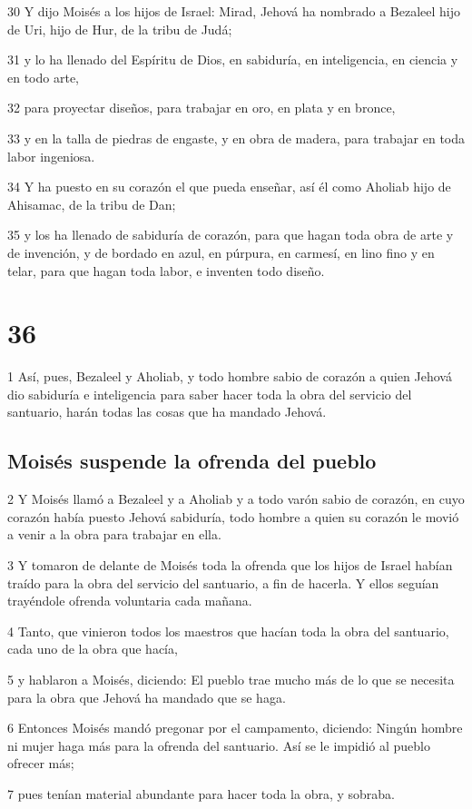 \par 30 Y dijo Moisés a los hijos de Israel: Mirad, Jehová ha nombrado a Bezaleel hijo de Uri, hijo de Hur, de la tribu de Judá;
\par 31 y lo ha llenado del Espíritu de Dios, en sabiduría, en inteligencia, en ciencia y en todo arte,
\par 32 para proyectar diseños, para trabajar en oro, en plata y en bronce,
\par 33 y en la talla de piedras de engaste, y en obra de madera, para trabajar en toda labor ingeniosa.
\par 34 Y ha puesto en su corazón el que pueda enseñar, así él como Aholiab hijo de Ahisamac, de la tribu de Dan;
\par 35 y los ha llenado de sabiduría de corazón, para que hagan toda obra de arte y de invención, y de bordado en azul, en púrpura, en carmesí, en lino fino y en telar, para que hagan toda labor, e inventen todo diseño.

\chapter{36}

\par 1 Así, pues, Bezaleel y Aholiab, y todo hombre sabio de corazón a quien Jehová dio sabiduría e inteligencia para saber hacer toda la obra del servicio del santuario, harán todas las cosas que ha mandado Jehová.

\section*{Moisés suspende la ofrenda del pueblo}

\par 2 Y Moisés llamó a Bezaleel y a Aholiab y a todo varón sabio de corazón, en cuyo corazón había puesto Jehová sabiduría, todo hombre a quien su corazón le movió a venir a la obra para trabajar en ella.
\par 3 Y tomaron de delante de Moisés toda la ofrenda que los hijos de Israel habían traído para la obra del servicio del santuario, a fin de hacerla. Y ellos seguían trayéndole ofrenda voluntaria cada mañana.
\par 4 Tanto, que vinieron todos los maestros que hacían toda la obra del santuario, cada uno de la obra que hacía,
\par 5 y hablaron a Moisés, diciendo: El pueblo trae mucho más de lo que se necesita para la obra que Jehová ha mandado que se haga.
\par 6 Entonces Moisés mandó pregonar por el campamento, diciendo: Ningún hombre ni mujer haga más para la ofrenda del santuario. Así se le impidió al pueblo ofrecer más;
\par 7 pues tenían material abundante para hacer toda la obra, y sobraba.

